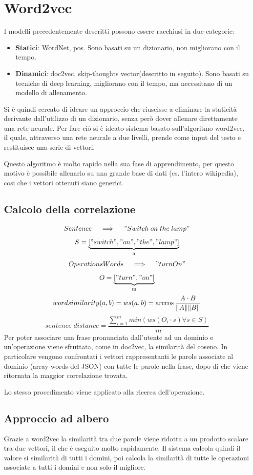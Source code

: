 \documentclass[twoside]{supsistudent}
\begin{document}
\section{Word2vec}
I modelli precedentemente descritti possono essere racchiusi in due categorie:
\begin{itemize}
  \item \textbf{Statici}: WordNet, pos. Sono basati su un dizionario, non migliorano con il tempo.
  \item \textbf{Dinamici}: doc2vec, skip-thoughts vector(descritto in seguito). Sono basati su tecniche di deep learning, migliorano con il tempo, ma necessitano di un modello di allenamento.
\end{itemize}
Si è quindi cercato di ideare un approccio che riuscisse a eliminare la staticità derivante dall'utilizzo di un dizionario, senza però dover allenare direttamente una rete neurale.
Per fare ciò si è ideato sistema basato sull'algoritmo word2vec, il quale, attraverso una rete neurale a due livelli, prende come input del testo e restituisce una serie di vettori. 

Questo algoritmo è molto rapido nella sua fase di apprendimento, per questo motivo è possibile allenarlo su una grande base di dati (es. l'intero wikipedia), cosi che i vettori ottenuti siano generici.\cite{word2vec}
\subsection{Calcolo della correlazione}
 \[
 Sentence \quad\implies\quad "Switch\;on\;the\;lamp"
 \]
 \[
 S = 
\underbrace{["switch","on","the","lamp"]}_\text{n}
\]
 \[
 OperationsWords \quad\implies\quad "turnOn"
 \]
 \[
 O = 
\underbrace{["turn","on"]}_\text{m}
\]
 \[
 word similarity (a,b)= ws(a,b) = \arccos{{A \cdot B \over \|A\| \|B\|}}  
\]
 \[
 sentence\;distance = \frac{\sum_{i=1}^{m} min(ws(O_i \cdot s)\forall s \in S)} {m}
 \]
Per poter associare una frase pronunciata dall'utente ad un dominio e un'operazione viene sfruttata, come in doc2vec, la similarità del coseno. In particolare vengono confrontati i vettori rappresentanti le parole associate al dominio (array words del JSON) con tutte le parole nella frase, dopo di che viene ritornata la maggior correlazione trovata.

Lo stesso procedimento viene applicato alla ricerca dell'operazione. 

\subsection{Approccio ad albero}
Grazie a word2vec la similarità tra due parole viene ridotta a un prodotto scalare tra due vettori, il che è eseguito molto rapidamente. Il sistema calcola quindi il valore si similarità di tutti i domini, poi calcola la similarità di tutte le operazioni associate a tutti i domini e non solo il migliore. 
\end{document}

